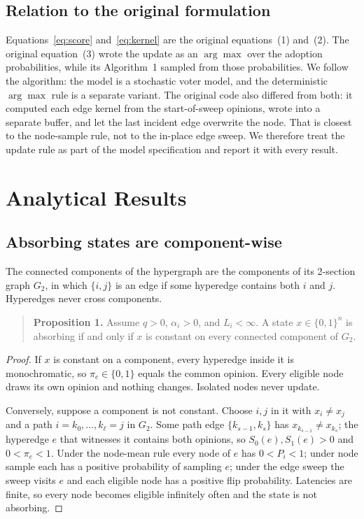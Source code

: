 \documentclass[conference]{IEEEtran}
\begin{document}
\subsection{Relation to the original formulation}
Equations~\eqref{eq:score} and~\eqref{eq:kernel} are the original equations~(1) and~(2). The original equation~(3) wrote the update as an $\arg\max$ over the adoption probabilities, while its Algorithm~1 sampled from those probabilities. We follow the algorithm: the model is a stochastic voter model, and the deterministic $\arg\max$ rule is a separate variant. The original code also differed from both: it computed each edge kernel from the start-of-sweep opinions, wrote into a separate buffer, and let the last incident edge overwrite the node. That is closest to the node-sample rule, not to the in-place edge sweep. We therefore treat the update rule as part of the model specification and report it with every result.

\section{Analytical Results}

\subsection{Absorbing states are component-wise}
The connected components of the hypergraph are the components of its 2-section graph $G_2$, in which $\{i,j\}$ is an edge if some hyperedge contains both $i$ and $j$. Hyperedges never cross components.

\begin{quote}
\textbf{Proposition 1.} Assume $q>0$, $\alpha_i>0$, and $L_i<\infty$. A state $x\in\{0,1\}^{n}$ is absorbing if and only if $x$ is constant on every connected component of $G_2$.
\end{quote}

\begin{proof}
If $x$ is constant on a component, every hyperedge inside it is monochromatic, so $\pi_e\in\{0,1\}$ equals the common opinion. Every eligible node draws its own opinion and nothing changes. Isolated nodes never update.

Conversely, suppose a component is not constant. Choose $i,j$ in it with $x_i\ne x_j$ and a path $i=k_0,\dots,k_\ell=j$ in $G_2$. Some path edge $\{k_{s-1},k_s\}$ has $x_{k_{s-1}}\ne x_{k_s}$; the hyperedge $e$ that witnesses it contains both opinions, so $S_0(e),S_1(e)>0$ and $0<\pi_e<1$. Under the node-mean rule every node of $e$ has $0<P_i<1$; under node sample each has a positive probability of sampling $e$; under the edge sweep the sweep visits $e$ and each eligible node has a positive flip probability. Latencies are finite, so every node becomes eligible infinitely often and the state is not absorbing.
\end{proof}
\end{document}
